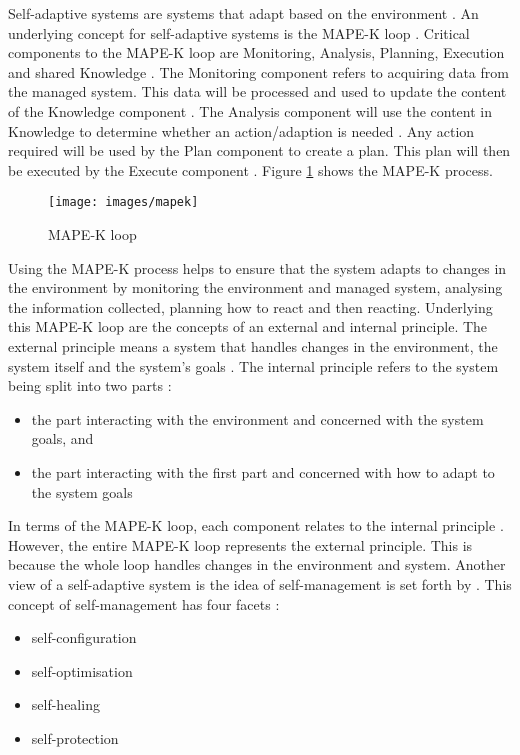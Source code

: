 Self-adaptive systems are systems that adapt based on the
environment \cite{macias2013self}. An underlying concept for self-adaptive systems is the MAPE-K loop \cite{kinneer2018managing}. Critical components to
the MAPE-K loop are Monitoring, Analysis, Planning, Execution and shared
Knowledge \cite{kephart2003vision}. The Monitoring component refers to
acquiring data from the managed system. This data will be processed and
used to update the content of the Knowledge component \cite{weyns2017software}. The
Analysis component will use the content in Knowledge to determine
whether an action/adaption is needed \cite{iglesia2015mape}. Any
action required will be used by the Plan component to create a plan.
This plan will then be executed by the Execute component \cite{kephart2003vision}. Figure \ref{fig:mapek} shows the MAPE-K process.
\begin{figure}
    \centering
    \texttt{[image: images/mapek]}
    \caption{MAPE-K loop }
    \label{fig:mapek}
\end{figure}
Using the MAPE-K process helps to ensure that the system adapts to
changes in the environment by monitoring the environment and managed
system, analysing the information collected, planning how to react and
then reacting.
\newline\newline
Underlying this MAPE-K loop are the concepts of an external and
internal principle. The external principle means a system that handles
changes in the environment, the system itself and the system's goals
\cite{weyns2017software}. The internal principle refers to the system being split
into two parts \cite{weyns2017software}:
\begin{itemize}
    \item the part interacting with the environment and concerned with the system goals, and 
    \item the part interacting with the first part and concerned with how to adapt to the system goals
\end{itemize}
In terms of the MAPE-K loop, each component relates to the internal
principle \cite{iglesia2015mape}. However, the entire MAPE-K loop
represents the external principle. This is because the whole loop
handles changes in the environment and system. Another view of a
self-adaptive system is the idea of self-management is set forth by
\cite{kephart2003vision}. This concept of self-management has four facets
\cite{kephart2003vision}:
\begin{itemize}
    \item self-configuration 
    \item self-optimisation
    \item self-healing 
    \item self-protection
\end{itemize} 

